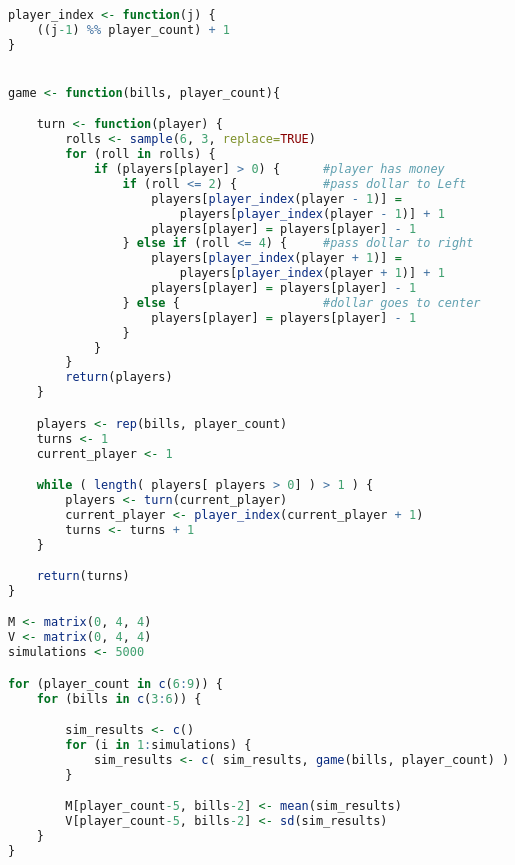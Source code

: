 
\begin{description}





\begin{lstlisting}[language=R]
player_index <- function(j) {
    ((j-1) %% player_count) + 1
}


game <- function(bills, player_count){

    turn <- function(player) {
        rolls <- sample(6, 3, replace=TRUE)
        for (roll in rolls) {
            if (players[player] > 0) {      #player has money
                if (roll <= 2) {            #pass dollar to Left
                    players[player_index(player - 1)] =
                        players[player_index(player - 1)] + 1 
                    players[player] = players[player] - 1
                } else if (roll <= 4) {     #pass dollar to right
                    players[player_index(player + 1)] =
                        players[player_index(player + 1)] + 1
                    players[player] = players[player] - 1
                } else {                    #dollar goes to center
                    players[player] = players[player] - 1
                }
            }
        }
        return(players)
    }

    players <- rep(bills, player_count)
    turns <- 1
    current_player <- 1

    while ( length( players[ players > 0] ) > 1 ) {
        players <- turn(current_player)
        current_player <- player_index(current_player + 1)
        turns <- turns + 1
    }

    return(turns)
}

M <- matrix(0, 4, 4)
V <- matrix(0, 4, 4)
simulations <- 5000

for (player_count in c(6:9)) {
    for (bills in c(3:6)) {

        sim_results <- c()
        for (i in 1:simulations) {
            sim_results <- c( sim_results, game(bills, player_count) )
        }

        M[player_count-5, bills-2] <- mean(sim_results)
        V[player_count-5, bills-2] <- sd(sim_results)
    }
}


\end{lstlisting}
\end{description}
